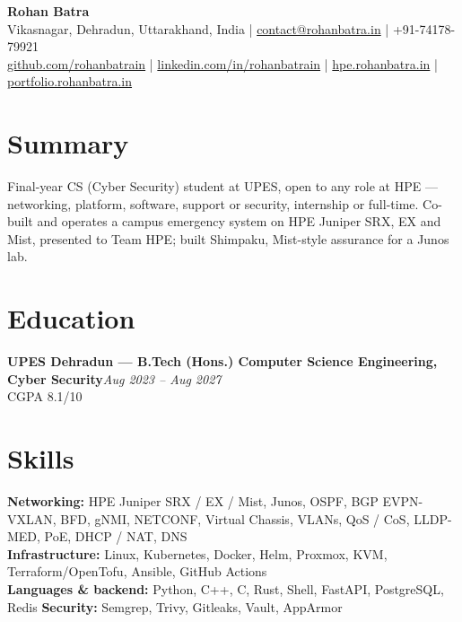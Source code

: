 \documentclass[10pt,a4paper]{article}
\newcommand{\entry}[3]{%
  \textbf{#1}\hfill\textit{\small #2}\\[-0.15em]
  {\small #3}\par\vspace{0.08em}%
}
\begin{document}
\begin{center}
  {\LARGE\bfseries Rohan Batra}\\[0.25em]
  {\small
    Vikasnagar, Dehradun, Uttarakhand, India \;|\; \href{mailto:contact@rohanbatra.in}{contact@rohanbatra.in} \;|\; +91-74178-79921\\[0.15em]
    \href{https://github.com/rohanbatrain}{github.com/rohanbatrain} \;|\; \href{https://linkedin.com/in/rohanbatrain}{linkedin.com/in/rohanbatrain} \;|\; \href{https://hpe.rohanbatra.in}{hpe.rohanbatra.in} \;|\; \href{https://portfolio.rohanbatra.in}{portfolio.rohanbatra.in}
  }
\end{center}


\section{Summary}
Final-year CS (Cyber Security) student at UPES, open to any role at HPE --- networking, platform, software, support or security, internship or full-time. Co-built and operates a campus emergency system on HPE Juniper SRX, EX and Mist, presented to Team HPE; built Shimpaku, Mist-style assurance for a Junos lab.

\section{Education}
\entry{UPES Dehradun --- B.Tech (Hons.) Computer Science Engineering, Cyber Security}{Aug 2023 -- Aug 2027}{CGPA 8.1/10}

\section{Skills}
\textbf{Networking:} HPE Juniper SRX / EX / Mist, Junos, OSPF, BGP EVPN-VXLAN, BFD, gNMI, NETCONF, Virtual Chassis, VLANs, QoS / CoS, LLDP-MED, PoE, DHCP / NAT, DNS\\
\textbf{Infrastructure:} Linux, Kubernetes, Docker, Helm, Proxmox, KVM, Terraform/OpenTofu, Ansible, GitHub Actions\\
\textbf{Languages \& backend:} Python, C++, C, Rust, Shell, FastAPI, PostgreSQL, Redis\quad
\textbf{Security:} Semgrep, Trivy, Gitleaks, Vault, AppArmor
\end{document}
